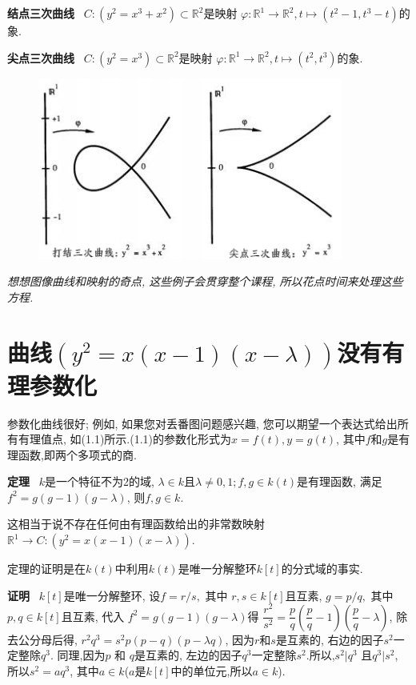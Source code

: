 \documentclass[UTF8]{book}
\begin{document}
	
		\textbf{结点三次曲线} \ $C:(y^{2}=x^{3}+x^{2})\subset \mathbb{R}^{2}$是映射 $\varphi:\mathbb{R}^{1}\rightarrow \mathbb{R}^{2} , t\longmapsto(t^{2}-1,t^{3}-t) $的象.
		
		\textbf{尖点三次曲线} \ $C:(y^{2}=x^{3})\subset \mathbb{R}^{2}$是映射 $\varphi:\mathbb{R}^{1}\rightarrow \mathbb{R}^{2} , t\longmapsto(t^{2},t^{3}) $的象.
		
		\begin{figure}[h]
		  \centering
		  \includegraphics[width=10cm]{27.jpg} \\
		\end{figure}
		
		\textit{想想图像曲线和映射的奇点, 这些例子会贯穿整个课程, 所以花点时间来处理这些方程.}

	\section{曲线$(y^{2}=x(x-1)(x-\lambda))$没有有理参数化}
		参数化曲线很好; 例如, 如果您对丢番图问题感兴趣, 您可以期望一个表达式给出所有有理值点, 如(1.1)所示.(1.1)的参数化形式为$ x = f(t), y = g(t) $, 其中$ f $和$ g $是有理函数,即两个多项式的商.
		
		\textbf{定理} \ $ k $是一个特征不为2的域, $\lambda\in k$且$\lambda\neq0,1;f,g\in k(t)$是有理函数, 满足$f^{2}=g(g-1)(g-\lambda)$, 则$f,g\in k$.
		
		
		这相当于说不存在任何由有理函数给出的非常数映射$\mathbb{R}^{1}\rightarrow C: (y^{2}=x(x-1)(x-\lambda))$.
		
		
		定理的证明是在$ k(t) $中利用$ k(t) $是唯一分解整环$ k[t] $的分式域的事实.
		
		
		\textbf{证明} \ $ k[t] $是唯一分解整环, 设$f=r/s,  $ 其中 $r,s\in k[t]$且互素, $g=p/q, $ 其中 $ p,q\in k[t]$且互素, 代入 $f^{2}=g(g-1)(g-\lambda)$得
		$\dfrac{r^{2}}{s^{2}}=\dfrac{p}{q}(\dfrac{p}{q}-1)(\dfrac{p}{q}-\lambda)$, 除去公分母后得, $r^{2}q^{3}=s^{2}p(p-q)(p-\lambda q)$, 因为$ r $和$ s $是互素的, 右边的因子$s^{2}$一定整除$q^{3}$. 同理,因为$ p$ 和 $q $是互素的, 左边的因子$q^{3}$一定整除$s^{2}$.所以,$s^{2}|q^{3}$ 且$q^{3}|s^{2}$, 所以$s^{2}=aq^{3}$, 其中$a\in k$($ a $是$ k[t] $中的单位元,所以$a\in k$).
		
\end{document}
